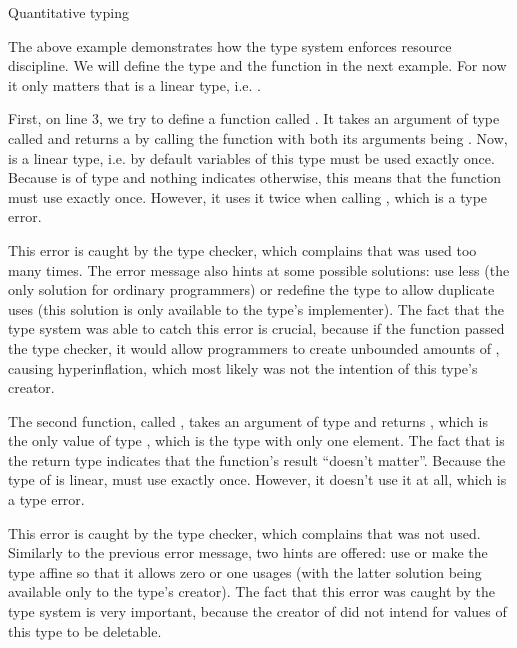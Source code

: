 \begin{example}{Quantitative typing}



\end{example}

The above example demonstrates how the type system enforces resource discipline. We will define the type  and the function  in the next example. For now it only matters that  is a linear type, i.e. .

First, on line 3, we try to define a function called . It takes an argument of type  called  and returns a  by calling the function  with both its arguments being . Now,  is a linear type, i.e. by default variables of this type must be used exactly once. Because  is of type  and nothing indicates otherwise, this means that the function  must use  exactly once. However, it uses it twice when calling , which is a type error.

This error is caught by the type checker, which complains that  was used too many times. The error message also hints at some possible solutions: use  less (the only solution for ordinary programmers) or redefine the type  to allow duplicate uses (this solution is only available to the type's implementer). The fact that the type system was able to catch this error is crucial, because if the function  passed the type checker, it would allow programmers to create unbounded amounts of , causing hyperinflation, which most likely was not the intention of this type's creator.

The second function, called , takes an argument  of type  and returns \code{()}, which is the only value of type , which is the type with only one element. The fact that  is the return type indicates that the function's result ``doesn't matter''. Because the type of  is linear,  must use  exactly once. However, it doesn't use it at all, which is a type error.

This error is caught by the type checker, which complains that  was not used. Similarly to the previous error message, two hints are offered: use  or make the type  affine so that it allows zero or one usages (with the latter solution being available only to the type's creator). The fact that this error was caught by the type system is very important, because the creator of  did not intend for values of this type to be deletable.

